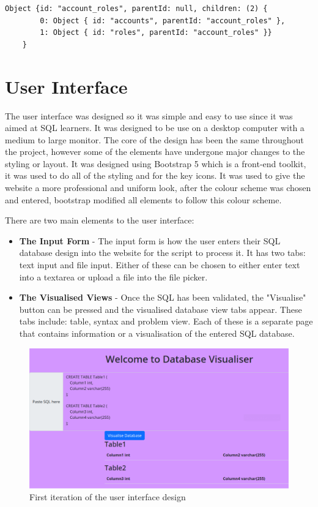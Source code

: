  \begin{lstlisting}[style=JavaScript, caption={}]
 	Object {id: "account_roles", parentId: null, children: (2) {
 		0: Object { id: "accounts", parentId: "account_roles" },
 		1: Object { id: "roles", parentId: "account_roles" }}
 	}
\end{lstlisting}

\newpage

\section{User Interface}

The user interface was designed so it was simple and easy to use since it was aimed at SQL learners. It was designed to be use on a desktop computer with a medium to large monitor. The core of the design has been the same throughout the project, however some of the elements have undergone major changes to the styling or layout. It was designed using Bootstrap 5 which is a front-end toolkit, it was used to do all of the styling and for the key icons. It was used to give the website a more professional and uniform look, after the colour scheme was chosen and entered, bootstrap modified all elements to follow this colour scheme.

There are two main elements to the user interface: 

\begin{itemize}
	\item \textbf{The Input Form} - The input form is how the user enters their SQL database design into the website for the script to process it. It has two tabs: text input and file input. Either of these can be chosen to either enter text into a textarea or upload a file into the file picker.
	\item \textbf{The Visualised Views} - Once the SQL has been validated, the "Visualise" button can be pressed and the visualised database view tabs appear. These tabs include: table, syntax and problem view. Each of these is a separate page that contains information or a visualisation of the entered SQL database.
\end{itemize}

\begin{figure}[h!]
	\centering
	\includegraphics[width=\textwidth]{firstDesign}
	\caption{First iteration of the user interface design}
	\label{fig:firstDesign}
\end{figure}

